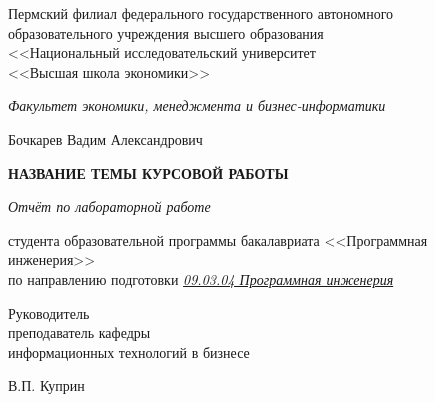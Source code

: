 \documentclass[a4paper,10pt]{article}
\begin{document}

\thispagestyle{empty}
\begin{center}
    \begingroup
    \fontsize{13pt}{15pt}\selectfont

    Пермский филиал федерального государственного автономного \\
    образовательного учреждения высшего образования \\
    <<Национальный исследовательский университет \\
    <<Высшая школа экономики>>

	\vspace{2em}
    \textit{Факультет экономики, менеджмента и бизнес-информатики}

    \vspace{4em}
    Бочкарев Вадим Александрович

    \vspace{3em}
    \textbf{НАЗВАНИЕ ТЕМЫ КУРСОВОЙ РАБОТЫ}

    \vspace{0.5em}
    \textit{Отчёт по лабораторной работе}

    \vspace{3em}

\fontsize{13pt}{15pt}\selectfont
    студента образовательной программы бакалавриата <<Программная инженерия>>\\
    по направлению подготовки \textit{\uline{09.03.04 Программная инженерия}}

\vfill

\hfill %
\parbox{6cm}{

    \fontsize{13pt}{15pt}\selectfont
    \begin{flushleft}
            Руководитель\\
            преподаватель кафедры\\
            информационных технологий в бизнесе

            \hrulefill

            В.П. Куприн
    \end{flushleft}
}

\vfill

\endgroup
{}\end{center}\newpage


\tableofcontents
\clearpage

\end{document}
